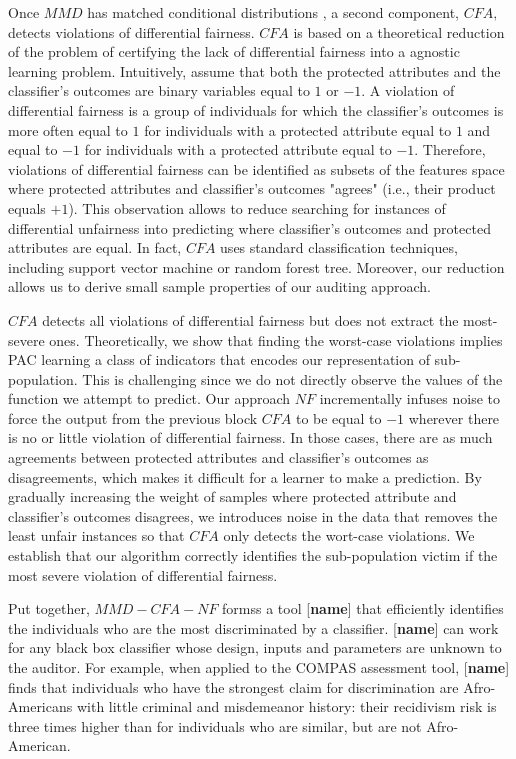 \documentclass{article}
\begin{document}
 \bigskip
 Once $MMD$ has matched conditional distributions , a second component, $CFA,$ detects violations of differential fairness. $CFA$ is based on a theoretical reduction of the problem of certifying the lack of differential fairness into a agnostic learning problem. Intuitively, assume that both the protected attributes and the classifier's outcomes are binary variables equal to $1$ or $-1$. A violation of differential fairness is a group of individuals for which the classifier's outcomes is more often equal to $1$ for individuals with a protected attribute equal to $1$ and equal to $-1$ for individuals with a protected attribute equal to $-1$. Therefore, violations of differential fairness can be identified as subsets of the features space where protected attributes and classifier's outcomes "agrees" (i.e., their product equals $+1$). This observation allows to reduce searching for instances of differential unfairness into predicting where classifier's outcomes and protected attributes are equal. In fact, $CFA$ uses standard classification techniques, including support vector machine or random forest tree. Moreover, our reduction allows us to derive small sample properties of our auditing approach.
 
 \bigskip
 $CFA$ detects all violations of differential fairness but does not extract the most-severe ones. Theoretically, we show that finding the worst-case violations implies PAC learning a class of indicators that encodes our representation of sub-population. This is challenging since we do not   directly observe the values of the function we attempt to predict. Our approach $NF$ incrementally infuses noise to force the output from the previous block $CFA$ to be equal to $-1$ wherever there is no or little violation of differential fairness. In those cases, there are as much agreements between protected attributes and classifier's outcomes as disagreements, which makes it difficult for a learner to make a prediction. By gradually increasing the weight of samples where protected attribute and classifier's outcomes disagrees, we introduces noise in the data that removes the least unfair instances so that $CFA$ only detects the wort-case violations. We establish that our algorithm correctly identifies the sub-population victim if the most severe violation of differential fairness.
	
\bigskip
Put together, $MMD-CFA-NF$ formss a tool [\textbf{name}] that efficiently identifies  the individuals who are the most discriminated by a classifier. [\textbf{name}] can work for any black box classifier whose design, inputs and parameters are unknown to the auditor. For example, when applied to the COMPAS assessment tool, [\textbf{name}] finds that individuals who have the strongest claim for discrimination are Afro-Americans with little criminal and misdemeanor history: their recidivism risk is three times higher than for individuals who are similar, but are not Afro-American. 
 
\end{document}
